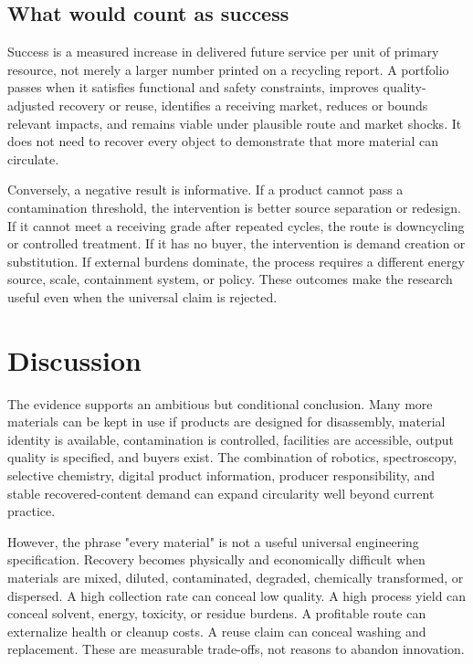 \documentclass[conference]{IEEEtran}
\begin{document}
\subsection{What would count as success}

Success is a measured increase in delivered future service per unit of primary resource, not merely a larger number printed on a recycling report. A portfolio passes when it satisfies functional and safety constraints, improves quality-adjusted recovery or reuse, identifies a receiving market, reduces or bounds relevant impacts, and remains viable under plausible route and market shocks. It does not need to recover every object to demonstrate that more material can circulate.

Conversely, a negative result is informative. If a product cannot pass a contamination threshold, the intervention is better source separation or redesign. If it cannot meet a receiving grade after repeated cycles, the route is downcycling or controlled treatment. If it has no buyer, the intervention is demand creation or substitution. If external burdens dominate, the process requires a different energy source, scale, containment system, or policy. These outcomes make the research useful even when the universal claim is rejected.

\section{Discussion}

The evidence supports an ambitious but conditional conclusion. Many more materials can be kept in use if products are designed for disassembly, material identity is available, contamination is controlled, facilities are accessible, output quality is specified, and buyers exist. The combination of robotics, spectroscopy, selective chemistry, digital product information, producer responsibility, and stable recovered-content demand can expand circularity well beyond current practice.

However, the phrase "every material" is not a useful universal engineering specification. Recovery becomes physically and economically difficult when materials are mixed, diluted, contaminated, degraded, chemically transformed, or dispersed. A high collection rate can conceal low quality. A high process yield can conceal solvent, energy, toxicity, or residue burdens. A profitable route can externalize health or cleanup costs. A reuse claim can conceal washing and replacement. These are measurable trade-offs, not reasons to abandon innovation.
\end{document}
